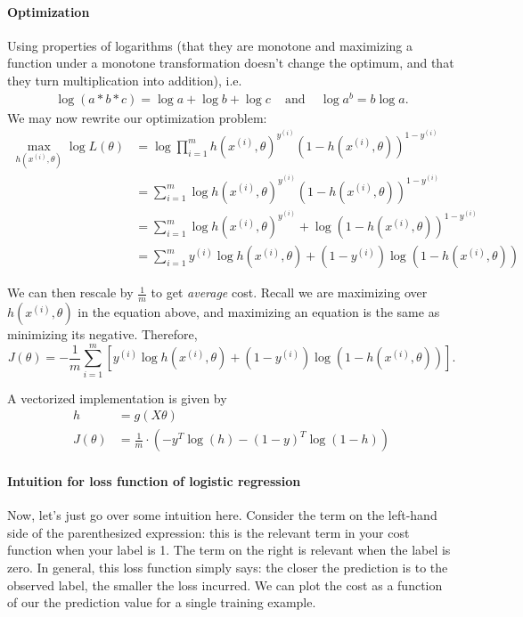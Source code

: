 \documentclass[12pt]{article}
\begin{document}
\paragraph{Optimization}
Using properties of logarithms (that they are monotone and maximizing a function under a monotone transformation doesn't change the optimum, and that they turn multiplication into addition), i.e.
\begin{align*}
  \log(a*b*c) = \log a + \log b + \log c \, \, \, \, \, \textrm{ and } \, \, \, \, \, \log a^b = b \log a.
\end{align*}
We may now rewrite our optimization problem:
\begin{align*}
  \max_{h(x^{(i)}, \theta)} \log L(\theta) &= \log \prod_{i=1}^{m} h(x^{(i)},                                              \theta)^{y^{(i)}} \left(1 - h(x^{(i)}, \theta)\right)^{1 - y^{(i)}} \\
  &= \sum_{i=1}^{m} \log h(x^{(i)}, \theta)^{y^{(i)}} \left(1 - h(x^{(i)},     \theta)\right)^{1 - y^{(i)}} \\
  &= \sum_{i=1}^{m} \log h(x^{(i)}, \theta)^{y^{(i)}}  + \log \left(1 - h(x^{(i)}, \theta)\right)^{1 - y^{(i)}} \\
  &= \sum_{i=1}^{m} y^{(i)} \log h(x^{(i)}, \theta) + (1 - y^{(i)}) \log \left(1 - h(x^{(i)}, \theta)\right)  
\end{align*}

We can then rescale by $\frac{1}{m}$ to get \emph{average} cost. Recall we are maximizing over $h(x^{(i)}, \theta)$ in the equation above, and maximizing an equation is the same as minimizing its negative. Therefore,
\[
  J(\theta) = -\frac{1}{m} \sum_{i=1}^{m} \left[ y^{(i)} \log h(x^{(i)}, \theta) + (1 - y^{(i)}) \log \left(1 - h(x^{(i)}, \theta)\right)\right]. 
\]

A vectorized implementation is given by
\begin{align*}
  h &= g(X\theta) \\
  J(\theta) &= \frac{1}{m} \cdot \left(-y^T \log(h) - \left(1 - y \right)^T \log (1 - h)\right)
\end{align*}

\paragraph{Intuition for loss function of logistic regression}
Now, let's just go over some intuition here. Consider the term on the left-hand side of the parenthesized expression: this is the relevant term in your cost function when your label is 1. The term on the right is relevant when the label is zero. In general, this loss function simply says: the closer the prediction is to the observed label, the smaller the loss incurred. We can plot the cost as a function of our the prediction value for a single training example.
\end{document}
